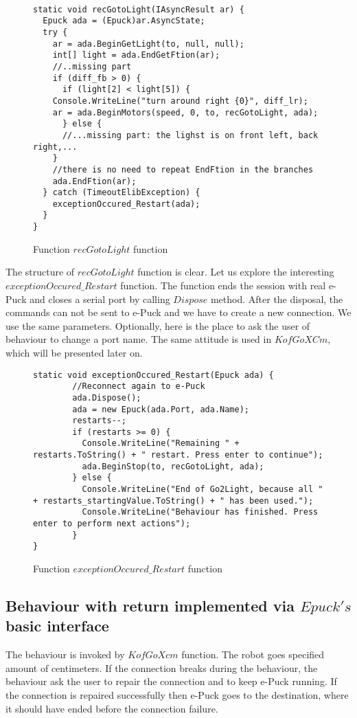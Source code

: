 \begin{figure}[!hbp]
\begin{lstlisting}
	
static void recGotoLight(IAsyncResult ar) {
  Epuck ada = (Epuck)ar.AsyncState;
  try {
    ar = ada.BeginGetLight(to, null, null);
    int[] light = ada.EndGetFtion(ar);
    //..missing part
    if (diff_fb > 0) {
      if (light[2] < light[5]) {
	Console.WriteLine("turn around right {0}", diff_lr);
	ar = ada.BeginMotors(speed, 0, to, recGotoLight, ada);
      } else {
      //...missing part: the lighst is on front left, back right,...
    }
    //there is no need to repeat EndFtion in the branches
    ada.EndFtion(ar);
  } catch (TimeoutElibException) {
    exceptionOccured_Restart(ada);
  }
}
\end{lstlisting}
\caption{Function $recGotoLight$ function} \label{go2light}
\end{figure}
	The structure of $recGotoLight$ function is clear. Let us explore the interesting $exceptionOccured\_Restart$ function.
	The function ends the session with real e-Puck and closes a serial port by calling $Dispose$ method.
	After the disposal, the commands can not be sent to e-Puck and we have to create a new connection. We use the same parameters.
	Optionally, here is the place to ask the user of behaviour to change a port name.
	The same attitude is used in $KofGoXCm$, which will be presented later on.
\begin{figure}[!hbp]
\begin{lstlisting}
static void exceptionOccured_Restart(Epuck ada) {
        //Reconnect again to e-Puck
        ada.Dispose();
        ada = new Epuck(ada.Port, ada.Name);
        restarts--;
        if (restarts >= 0) {
          Console.WriteLine("Remaining " + restarts.ToString() + " restart. Press enter to continue");
          ada.BeginStop(to, recGotoLight, ada);
        } else {
          Console.WriteLine("End of Go2Light, because all " + restarts_startingValue.ToString() + " has been used.");
          Console.WriteLine("Behaviour has finished. Press enter to perform next actions");
        }
}
\end{lstlisting}
\caption{Function $exceptionOccured\_Restart$ function} \label{restart}
\end{figure}

\subsection{Behaviour with return implemented via $Epuck's$ basic interface}\label{sec:kofgoxcm}
	The behaviour is invoked by $KofGoXcm$ function. 
	The robot goes specified amount of centimeters. 
	If the connection breaks during the behaviour, 
	the behaviour ask the user to repair the connection and to keep e-Puck running. 
	If the connection is repaired successfully then e-Puck goes to the destination, 
	where it should have ended before the connection failure.

